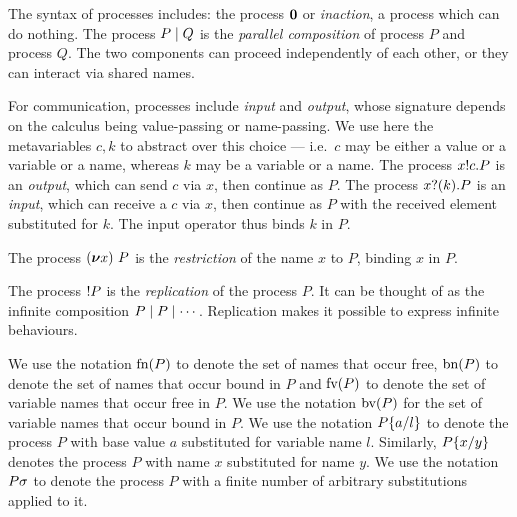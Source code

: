 \documentclass[runningheads]{llncs}
\begin{document}
The syntax of processes includes:
the process \( \bm{0} \) or \emph{inaction}, a process which can do nothing. The process \( P \mid Q \) is the \emph{parallel composition} of process \( P \) and process \( Q \).
The two components can proceed independently of each other, or they can interact via shared names.

For communication, processes include \emph{input} and \emph{output}, whose
signature depends on the calculus being value-passing or name-passing.
We use here the metavariables $c,k$ to abstract over this choice
--- i.e.~$c$ may be either a value or a variable or a name, whereas $k$ may
be a variable or a name.
The process \( x ! c . P \) is an \emph{output}, which can send
\( c \) via \( x \), then continue as \( P \).  %
The process \( x ? (k) . P \) is an \emph{input}, which can receive a $c$
via \( x \), then continue as \( P \) with the received element
substituted for \( k \).  The input operator thus
binds \( k \) in \( P \).

The process \( (\bm{\nu} x)~P \) is the \emph{restriction} of the name
\( x \) to \( P \), binding \( x \) in \( P \).


The process \( {!}P \) is the \emph{replication} of the process \( P \).
It can be thought of as the infinite composition \( P \mid P \mid \cdots \).
Replication makes it possible to express infinite behaviours.

We use the notation \( \textrm{fn}(P) \) to denote the set of
names that occur free,
\( \textrm{bn}(P) \) to denote the set of names that occur bound
in \( P \) and  \( \textrm{fv}(P) \)
to denote the set of variable names that occur free
in \( P \).  We use the notation \( \textrm{bv}(P) \)
for the set of variable names that occur bound
in \( P \).  We use the notation \( P\{a/l\} \) to denote
the process \( P \) with base value \( a \) substituted for variable name
\( l \). Similarly, \( P\{x/y\} \) denotes the process
\( P \) with name \( x \) substituted for name \( y \).
We use the notation \( P\sigma \) to denote the process \( P \) with a finite number of arbitrary substitutions applied to it.
\end{document}

